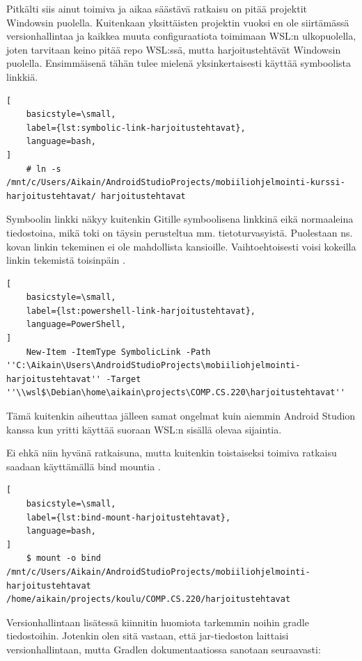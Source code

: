 Pitkälti siis ainut toimiva ja aikaa säästävä ratkaisu on pitää projektit
Windowsin puolella. Kuitenkaan yksittäisten projektin vuoksi en ole siirtämässä
versionhallintaa ja kaikkea muuta configuraatiota toimimaan WSL:n ulkopuolella,
joten tarvitaan keino pitää repo WSL:ssä, mutta harjoitustehtävät Windowsin
puolella. Ensimmäisenä tähän tulee mielenä yksinkertaisesti käyttää symboolista
linkkiä.

\begin{lstlisting}[
    basicstyle=\small,
    label={lst:symbolic-link-harjoitustehtavat},
    language=bash,
]
    # ln -s /mnt/c/Users/Aikain/AndroidStudioProjects/mobiiliohjelmointi-kurssi-harjoitustehtavat/ harjoitustehtavat
\end{lstlisting}

Symboolin linkki näkyy kuitenkin Gitille symboolisena linkkinä eikä normaaleina
tiedostoina, mikä toki on täysin perusteltua mm. tietoturvasyistä. Puolestaan
ns. kovan linkin tekeminen ei ole mahdollista kansioille. Vaihtoehtoisesti
voisi kokeilla linkin tekemistä toisinpäin
\parencite{StackoverflowWSLSymlink}.

\begin{lstlisting}[
    basicstyle=\small,
    label={lst:powershell-link-harjoitustehtavat},
    language=PowerShell,
]
    New-Item -ItemType SymbolicLink -Path ''C:\Aikain\Users\AndroidStudioProjects\mobiiliohjelmointi-harjoitustehtavat'' -Target ''\\wsl$\Debian\home\aikain\projects\COMP.CS.220\harjoitustehtavat''
\end{lstlisting}

Tämä kuitenkin aiheuttaa jälleen samat ongelmat kuin aiemmin Android Studion
kanssa kun yritti käyttää suoraan WSL:n sisällä olevaa sijaintia.

Ei ehkä niin hyvänä ratkaisuna, mutta kuitenkin toistaiseksi toimiva ratkaisu
saadaan käyttämällä bind mountia \parencite{BaeldungBindMounts}.

\begin{lstlisting}[
    basicstyle=\small,
    label={lst:bind-mount-harjoitustehtavat},
    language=bash,
]
    $ mount -o bind /mnt/c/Users/Aikain/AndroidStudioProjects/mobiiliohjelmointi-harjoitustehtavat /home/aikain/projects/koulu/COMP.CS.220/harjoitustehtavat
\end{lstlisting}

Versionhallintaan lisätessä kiinnitin huomiota tarkemmin noihin gradle
tiedostoihin. Jotenkin olen sitä vastaan, että jar-tiedoston laittaisi
versionhallintaan, mutta Gradlen dokumentaatiossa
\parencite{GradleDocsGradleWrapper} sanotaan seuraavasti:

